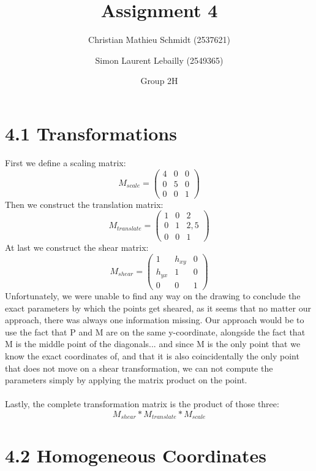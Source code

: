 \documentclass{article}
\title{Assignment 4}
\author{Christian Mathieu Schmidt (2537621)
\and Simon Laurent Lebailly (2549365)\\
\and Group 2H}
\begin{document}
\maketitle


\section*{4.1 Transformations} \label{ex1}
    First we define a scaling matrix:
    $$M_{scale} = \left( \begin{matrix} 4 & 0 & 0 \\ 0 & 5 & 0 \\ 0 & 0 & 1 \end{matrix} \right)$$
    Then we construct the translation matrix:
    $$M_{translate} = \left( \begin{matrix} 1 & 0 & 2 \\ 0 & 1 & 2,5 \\ 0 & 0 & 1 \end{matrix} \right)$$
    At last we construct the shear matrix:
    $$M_{shear} = \left( \begin{matrix} 1 & h_{xy} & 0 \\ h_{yx} & 1 & 0 \\ 0 & 0 & 1 \end{matrix} \right)$$
    Unfortunately, we were unable to find any way on the drawing to conclude the exact parameters by which the points get sheared, as it seems that no matter our approach, there was always one information missing. Our approach would be to use the fact that P and M are on the same y-coordinate, alongside the fact that M is the middle point of the diagonals... and since M is the only point that we know the exact coordinates of, and that it is also coincidentally the only point that does not move on a shear transformation, we can not compute the parameters simply by applying the matrix product on the point.\\\\
    Lastly, the complete transformation matrix is the product of those three:
    $$M_{shear} * M_{translate} * M_{scale}$$

\newpage
\section*{4.2 Homogeneous Coordinates} \label{ex2}
\end{document}
